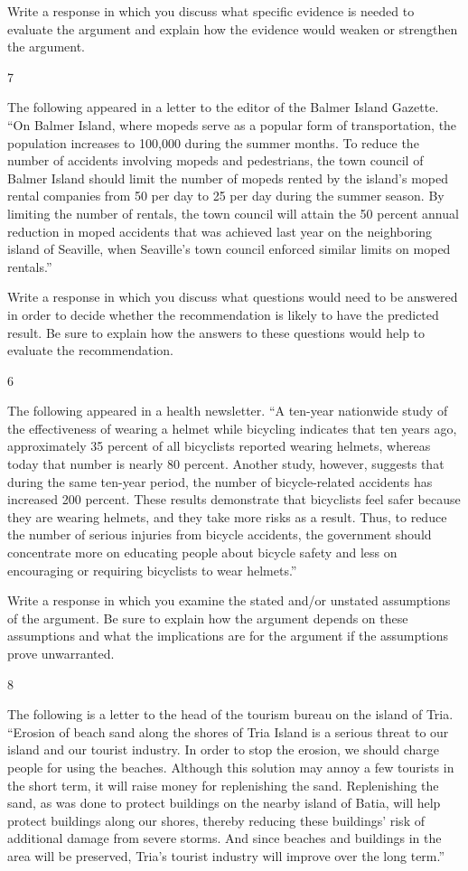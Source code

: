 \documentclass[]{article}
\begin{document}
Write a response in which you discuss what specific evidence is needed
to evaluate the argument and explain how the evidence would weaken or
strengthen the argument.

7

The following appeared in a letter to the editor of the Balmer Island
Gazette. ``On Balmer Island, where mopeds serve as a popular form of
transportation, the population increases to 100,000 during the summer
months. To reduce the number of accidents involving mopeds and
pedestrians, the town council of Balmer Island should limit the number
of mopeds rented by the island's moped rental companies from 50 per day
to 25 per day during the summer season. By limiting the number of
rentals, the town council will attain the 50 percent annual reduction in
moped accidents that was achieved last year on the neighboring island of
Seaville, when Seaville's town council enforced similar limits on moped
rentals.''

Write a response in which you discuss what questions would need to be
answered in order to decide whether the recommendation is likely to have
the predicted result. Be sure to explain how the answers to these
questions would help to evaluate the recommendation.

6

The following appeared in a health newsletter. ``A ten-year nationwide
study of the effectiveness of wearing a helmet while bicycling indicates
that ten years ago, approximately 35 percent of all bicyclists reported
wearing helmets, whereas today that number is nearly 80 percent. Another
study, however, suggests that during the same ten-year period, the
number of bicycle-related accidents has increased 200 percent. These
results demonstrate that bicyclists feel safer because they are wearing
helmets, and they take more risks as a result. Thus, to reduce the
number of serious injuries from bicycle accidents, the government should
concentrate more on educating people about bicycle safety and less on
encouraging or requiring bicyclists to wear helmets.''

Write a response in which you examine the stated and/or unstated
assumptions of the argument. Be sure to explain how the argument depends
on these assumptions and what the implications are for the argument if
the assumptions prove unwarranted.

8

The following is a letter to the head of the tourism bureau on the
island of Tria. ``Erosion of beach sand along the shores of Tria Island
is a serious threat to our island and our tourist industry. In order to
stop the erosion, we should charge people for using the beaches.
Although this solution may annoy a few tourists in the short term, it
will raise money for replenishing the sand. Replenishing the sand, as
was done to protect buildings on the nearby island of Batia, will help
protect buildings along our shores, thereby reducing these buildings'
risk of additional damage from severe storms. And since beaches and
buildings in the area will be preserved, Tria's tourist industry will
improve over the long term.''
\end{document}

